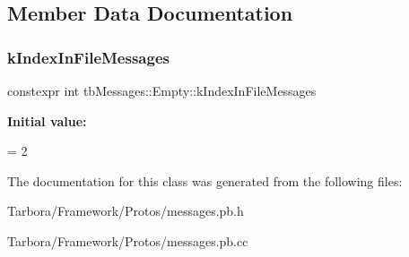 \subsection{Member Data Documentation}
\mbox{\label{classtbMessages_1_1Empty_afb6c4379d22cec14b098090dc97b919a}} 
\subsubsection{\texorpdfstring{k\+Index\+In\+File\+Messages}{kIndexInFileMessages}}
{\footnotesize\ttfamily constexpr int tb\+Messages\+::\+Empty\+::k\+Index\+In\+File\+Messages\hspace{0.3cm}{\ttfamily [static]}}

{\bfseries Initial value\+:}
\begin{DoxyCode}
=
    2
\end{DoxyCode}


The documentation for this class was generated from the following files\+:\begin{DoxyCompactItemize}
\item 
Tarbora/\+Framework/\+Protos/messages.\+pb.\+h\item 
Tarbora/\+Framework/\+Protos/messages.\+pb.\+cc\end{DoxyCompactItemize}

